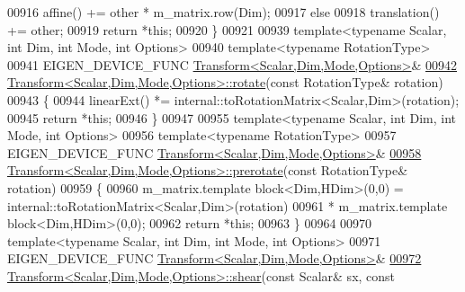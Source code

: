 \begin{DoxyCode}
00916     affine() += other * m\_matrix.row(Dim);
00917   \textcolor{keywordflow}{else}
00918     translation() += other;
00919   \textcolor{keywordflow}{return} *\textcolor{keyword}{this};
00920 \}
00921 
00939 \textcolor{keyword}{template}<\textcolor{keyword}{typename} Scalar, \textcolor{keywordtype}{int} Dim, \textcolor{keywordtype}{int} Mode, \textcolor{keywordtype}{int} Options>
00940 \textcolor{keyword}{template}<\textcolor{keyword}{typename} RotationType>
00941 EIGEN\_DEVICE\_FUNC \hyperlink{group___geometry___module_class_eigen_1_1_transform}{Transform<Scalar,Dim,Mode,Options>}&
\hyperlink{group___geometry___module_a6cfe95a4da33cfbc2092ac2fedee332f}{00942} \hyperlink{group___geometry___module_class_eigen_1_1_transform}{Transform<Scalar,Dim,Mode,Options>::rotate}(\textcolor{keyword}{const} RotationType& 
      rotation)
00943 \{
00944   linearExt() *= internal::toRotationMatrix<Scalar,Dim>(rotation);
00945   \textcolor{keywordflow}{return} *\textcolor{keyword}{this};
00946 \}
00947 
00955 \textcolor{keyword}{template}<\textcolor{keyword}{typename} Scalar, \textcolor{keywordtype}{int} Dim, \textcolor{keywordtype}{int} Mode, \textcolor{keywordtype}{int} Options>
00956 \textcolor{keyword}{template}<\textcolor{keyword}{typename} RotationType>
00957 EIGEN\_DEVICE\_FUNC \hyperlink{group___geometry___module_class_eigen_1_1_transform}{Transform<Scalar,Dim,Mode,Options>}&
\hyperlink{group___geometry___module_a792f34919d06710b97c0c5d106b5b584}{00958} \hyperlink{group___geometry___module_class_eigen_1_1_transform}{Transform<Scalar,Dim,Mode,Options>::prerotate}(\textcolor{keyword}{const} 
      RotationType& rotation)
00959 \{
00960   m\_matrix.template block<Dim,HDim>(0,0) = internal::toRotationMatrix<Scalar,Dim>(rotation)
00961                                          * m\_matrix.template block<Dim,HDim>(0,0);
00962   \textcolor{keywordflow}{return} *\textcolor{keyword}{this};
00963 \}
00964 
00970 \textcolor{keyword}{template}<\textcolor{keyword}{typename} Scalar, \textcolor{keywordtype}{int} Dim, \textcolor{keywordtype}{int} Mode, \textcolor{keywordtype}{int} Options>
00971 EIGEN\_DEVICE\_FUNC \hyperlink{group___geometry___module_class_eigen_1_1_transform}{Transform<Scalar,Dim,Mode,Options>}&
\hyperlink{group___geometry___module_a2999a84269a4a08d3af8a3ad1b0598ef}{00972} \hyperlink{group___geometry___module_a2999a84269a4a08d3af8a3ad1b0598ef}{Transform<Scalar,Dim,Mode,Options>::shear}(\textcolor{keyword}{const} Scalar& sx, \textcolor{keyword}{const} 

\end{DoxyCode}
